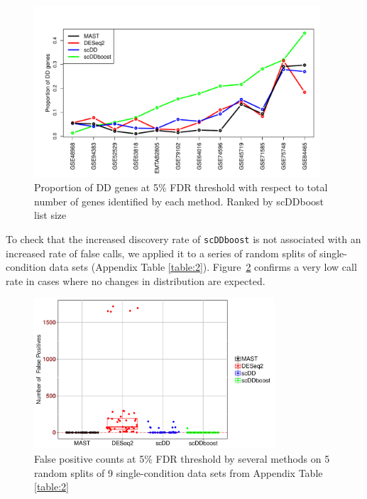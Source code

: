 \documentclass[aoas,preprint]{imsart}
\begin{document}
\begin{figure}[H]
\includegraphics[width = 0.95\textwidth]{Figs/DD95.pdf}
 \caption{Proportion of DD genes at 5\% FDR threshold with respect to total number of genes identified by each method. Ranked by 
 scDDboost list size }
  \label{fig:es}
\end{figure}


To check that the increased discovery rate
of   \verb+scDDboost+ is  not associated with an increased rate of false calls, we 
applied it to a series of random splits of single-condition data sets (Appendix Table \ref{table:2}). Figure~\ref{nullperm}
confirms a very low call rate in cases where no changes in distribution are expected.



\begin{figure}[H]
\includegraphics[width = 0.8\textwidth]{Figs/fdrCounts.pdf}
 \caption{False positive counts at 5\% FDR threshold by several methods on  5 random splits of 9 single-condition
data sets from Appendix Table \ref{table:2}} \label{nullperm}
\end{figure}
\end{document}
